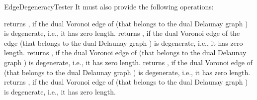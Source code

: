 \begin{ccRefFunctionObjectConcept}{EdgeDegeneracyTester}
\ccOperations
It must also provide the following operations:

\ccThreeToTwo
{}
{returns , if the dual Voronoi edge of  (that
  belongs to the dual Delaunay graph ) is
  degenerate, i.e., it has zero length.}
%
{returns , if the dual Voronoi edge of the edge
   (that belongs to the dual Delaunay graph ) is
  degenerate, i.e., it has zero length.}
%
\ccGlue
{}
{returns , if the dual Voronoi edge of  (that
  belongs to the dual Delaunay graph ) is
  degenerate, i.e., it has zero length.}
%
\ccGlue
{}
{returns , if the dual Voronoi edge of  (that
  belongs to the dual Delaunay graph ) is
  degenerate, i.e., it has zero length.}
%
\ccGlue
{}
{returns , if the dual Voronoi edge of   (that
  belongs to the dual Delaunay graph ) is
  degenerate, i.e., it has zero length.}


\ccSeeAlso
{}\\

\end{ccRefFunctionObjectConcept}
